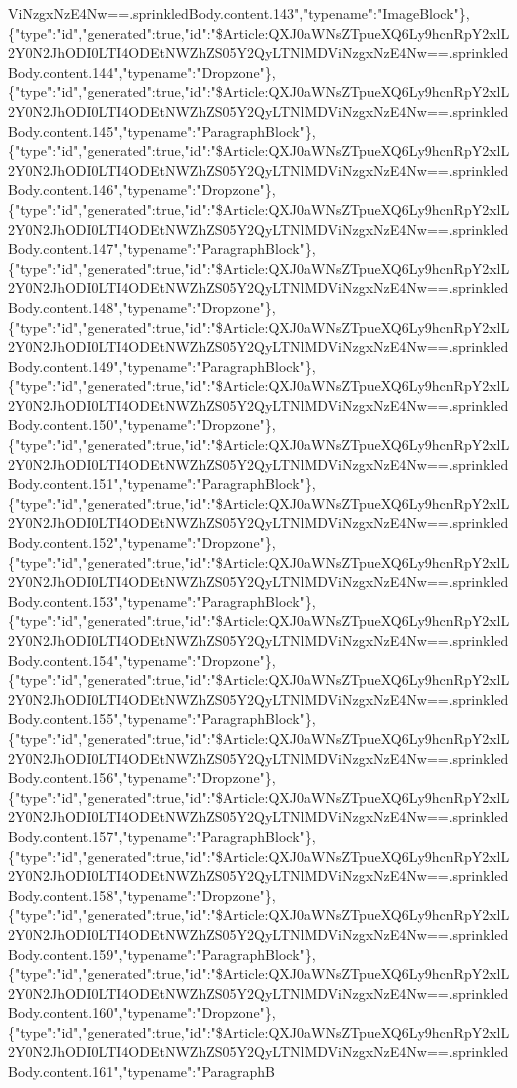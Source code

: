 ViNzgxNzE4Nw==.sprinkledBody.content.143","typename":"ImageBlock"\},\{"type":"id","generated":true,"id":"\$Article:QXJ0aWNsZTpueXQ6Ly9hcnRpY2xlL2Y0N2JhODI0LTI4ODEtNWZhZS05Y2QyLTNlMDViNzgxNzE4Nw==.sprinkledBody.content.144","typename":"Dropzone"\},\{"type":"id","generated":true,"id":"\$Article:QXJ0aWNsZTpueXQ6Ly9hcnRpY2xlL2Y0N2JhODI0LTI4ODEtNWZhZS05Y2QyLTNlMDViNzgxNzE4Nw==.sprinkledBody.content.145","typename":"ParagraphBlock"\},\{"type":"id","generated":true,"id":"\$Article:QXJ0aWNsZTpueXQ6Ly9hcnRpY2xlL2Y0N2JhODI0LTI4ODEtNWZhZS05Y2QyLTNlMDViNzgxNzE4Nw==.sprinkledBody.content.146","typename":"Dropzone"\},\{"type":"id","generated":true,"id":"\$Article:QXJ0aWNsZTpueXQ6Ly9hcnRpY2xlL2Y0N2JhODI0LTI4ODEtNWZhZS05Y2QyLTNlMDViNzgxNzE4Nw==.sprinkledBody.content.147","typename":"ParagraphBlock"\},\{"type":"id","generated":true,"id":"\$Article:QXJ0aWNsZTpueXQ6Ly9hcnRpY2xlL2Y0N2JhODI0LTI4ODEtNWZhZS05Y2QyLTNlMDViNzgxNzE4Nw==.sprinkledBody.content.148","typename":"Dropzone"\},\{"type":"id","generated":true,"id":"\$Article:QXJ0aWNsZTpueXQ6Ly9hcnRpY2xlL2Y0N2JhODI0LTI4ODEtNWZhZS05Y2QyLTNlMDViNzgxNzE4Nw==.sprinkledBody.content.149","typename":"ParagraphBlock"\},\{"type":"id","generated":true,"id":"\$Article:QXJ0aWNsZTpueXQ6Ly9hcnRpY2xlL2Y0N2JhODI0LTI4ODEtNWZhZS05Y2QyLTNlMDViNzgxNzE4Nw==.sprinkledBody.content.150","typename":"Dropzone"\},\{"type":"id","generated":true,"id":"\$Article:QXJ0aWNsZTpueXQ6Ly9hcnRpY2xlL2Y0N2JhODI0LTI4ODEtNWZhZS05Y2QyLTNlMDViNzgxNzE4Nw==.sprinkledBody.content.151","typename":"ParagraphBlock"\},\{"type":"id","generated":true,"id":"\$Article:QXJ0aWNsZTpueXQ6Ly9hcnRpY2xlL2Y0N2JhODI0LTI4ODEtNWZhZS05Y2QyLTNlMDViNzgxNzE4Nw==.sprinkledBody.content.152","typename":"Dropzone"\},\{"type":"id","generated":true,"id":"\$Article:QXJ0aWNsZTpueXQ6Ly9hcnRpY2xlL2Y0N2JhODI0LTI4ODEtNWZhZS05Y2QyLTNlMDViNzgxNzE4Nw==.sprinkledBody.content.153","typename":"ParagraphBlock"\},\{"type":"id","generated":true,"id":"\$Article:QXJ0aWNsZTpueXQ6Ly9hcnRpY2xlL2Y0N2JhODI0LTI4ODEtNWZhZS05Y2QyLTNlMDViNzgxNzE4Nw==.sprinkledBody.content.154","typename":"Dropzone"\},\{"type":"id","generated":true,"id":"\$Article:QXJ0aWNsZTpueXQ6Ly9hcnRpY2xlL2Y0N2JhODI0LTI4ODEtNWZhZS05Y2QyLTNlMDViNzgxNzE4Nw==.sprinkledBody.content.155","typename":"ParagraphBlock"\},\{"type":"id","generated":true,"id":"\$Article:QXJ0aWNsZTpueXQ6Ly9hcnRpY2xlL2Y0N2JhODI0LTI4ODEtNWZhZS05Y2QyLTNlMDViNzgxNzE4Nw==.sprinkledBody.content.156","typename":"Dropzone"\},\{"type":"id","generated":true,"id":"\$Article:QXJ0aWNsZTpueXQ6Ly9hcnRpY2xlL2Y0N2JhODI0LTI4ODEtNWZhZS05Y2QyLTNlMDViNzgxNzE4Nw==.sprinkledBody.content.157","typename":"ParagraphBlock"\},\{"type":"id","generated":true,"id":"\$Article:QXJ0aWNsZTpueXQ6Ly9hcnRpY2xlL2Y0N2JhODI0LTI4ODEtNWZhZS05Y2QyLTNlMDViNzgxNzE4Nw==.sprinkledBody.content.158","typename":"Dropzone"\},\{"type":"id","generated":true,"id":"\$Article:QXJ0aWNsZTpueXQ6Ly9hcnRpY2xlL2Y0N2JhODI0LTI4ODEtNWZhZS05Y2QyLTNlMDViNzgxNzE4Nw==.sprinkledBody.content.159","typename":"ParagraphBlock"\},\{"type":"id","generated":true,"id":"\$Article:QXJ0aWNsZTpueXQ6Ly9hcnRpY2xlL2Y0N2JhODI0LTI4ODEtNWZhZS05Y2QyLTNlMDViNzgxNzE4Nw==.sprinkledBody.content.160","typename":"Dropzone"\},\{"type":"id","generated":true,"id":"\$Article:QXJ0aWNsZTpueXQ6Ly9hcnRpY2xlL2Y0N2JhODI0LTI4ODEtNWZhZS05Y2QyLTNlMDViNzgxNzE4Nw==.sprinkledBody.content.161","typename":"ParagraphB